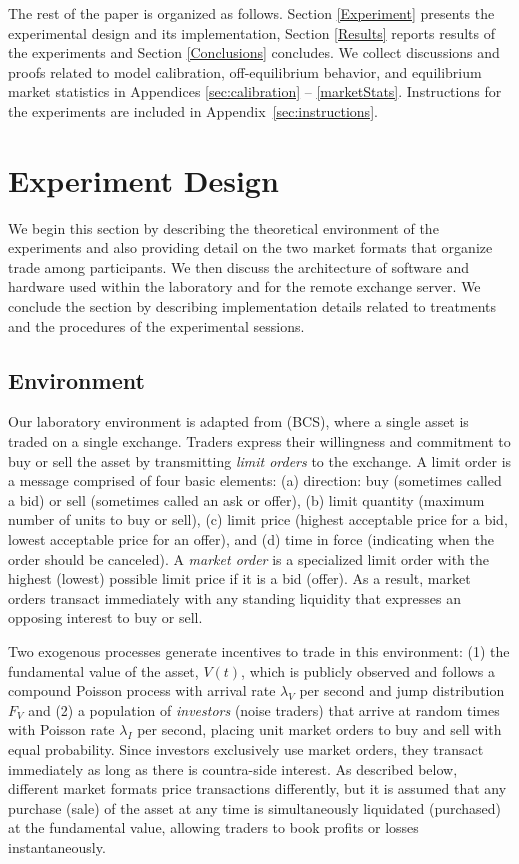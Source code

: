 \documentclass[12pt]{article}
\begin{document}
The rest of the paper is organized as follows. Section \ref{Experiment} presents the experimental design and its implementation, Section \ref{Results} reports results of the experiments and Section \ref{Conclusions} concludes. We collect discussions and proofs related to model calibration, off-equilibrium behavior, and equilibrium market statistics in Appendices \ref{sec:calibration} -- \ref{marketStats}. Instructions for the experiments are included in Appendix~\ref{sec:instructions}.

\section{Experiment Design \label{Experiment}}

We begin this section by describing the theoretical environment of the experiments and also providing detail on the two market formats that organize trade among participants. We then discuss the architecture of software and hardware used within the laboratory and for the remote exchange server. We conclude the section by describing implementation details related to  treatments and the procedures of the experimental sessions.

\subsection{Environment}
\label{sec:environment}

Our laboratory environment is adapted from \cite{Budish2015} (BCS), where a single asset is traded on a single exchange. Traders express their willingness and commitment to buy or sell the asset by transmitting \textit{limit orders} to the exchange. A limit order is a message comprised of four basic elements: (a) direction: buy (sometimes called a bid) or sell (sometimes called an ask or offer), (b) limit quantity (maximum number of units to buy or sell), (c) limit price (highest acceptable price for a bid, lowest acceptable price for an offer), and (d) time in force (indicating when the order should be canceled). A \textit{market order} is a specialized limit order with the highest (lowest) possible limit price if it is a bid (offer). As a result, market orders transact immediately with any standing liquidity that expresses an opposing interest to buy or sell.

Two exogenous processes generate incentives to trade in this environment: (1) the fundamental value of the asset, $V(t)$, which is publicly observed and follows a compound Poisson process with arrival rate $\lambda_V$ per second and jump distribution $F_V$ and (2) a population of \textit{investors} (noise traders) that arrive at random times with Poisson rate $\lambda_I$ per second, placing unit market orders to buy and sell with equal probability. Since investors exclusively use market orders, they transact immediately as long as there is countra-side interest. As described below, different market formats price transactions differently, but it is assumed that any purchase (sale) of the asset at any time is simultaneously liquidated (purchased) at the fundamental value, allowing traders to book profits or losses instantaneously.
\end{document}
